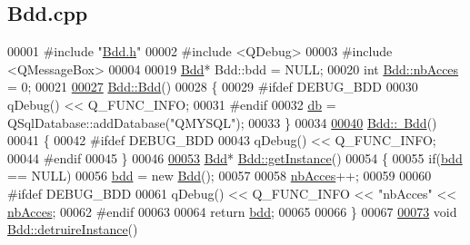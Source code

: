 \hypertarget{_bdd_8cpp_source}{}\subsection{Bdd.\+cpp}
\label{_bdd_8cpp_source}

\begin{DoxyCode}
00001 \textcolor{preprocessor}{#include "\hyperlink{_bdd_8h}{Bdd.h}"}
00002 \textcolor{preprocessor}{#include <QDebug>}
00003 \textcolor{preprocessor}{#include <QMessageBox>}
00004 
00019 \hyperlink{class_bdd}{Bdd}* Bdd::bdd = NULL;
00020 \textcolor{keywordtype}{int} \hyperlink{class_bdd_a9fb6aa118a28c27307f27fd7662e462d}{Bdd::nbAcces} = 0;
00021 
\hyperlink{class_bdd_a5306aeacb2baa3be8d4d3f8326527f60}{00027} \hyperlink{class_bdd_a5306aeacb2baa3be8d4d3f8326527f60}{Bdd::Bdd}()
00028 \{
00029 \textcolor{preprocessor}{    #ifdef DEBUG\_BDD}
00030     qDebug() << Q\_FUNC\_INFO;
00031 \textcolor{preprocessor}{    #endif}
00032     \hyperlink{class_bdd_a8628c1686deda86999f86689c3e7268e}{db} = QSqlDatabase::addDatabase(\textcolor{stringliteral}{"QMYSQL"});
00033 \}
00034 
\hyperlink{class_bdd_a5029277f27f8cfcf9d8603fb331a15dd}{00040} \hyperlink{class_bdd_a5029277f27f8cfcf9d8603fb331a15dd}{Bdd::~Bdd}()
00041 \{
00042 \textcolor{preprocessor}{    #ifdef DEBUG\_BDD}
00043     qDebug() << Q\_FUNC\_INFO;
00044 \textcolor{preprocessor}{    #endif}
00045 \}
00046 
\hyperlink{class_bdd_a6f55c29d593da12ca31fad02f5adfe24}{00053} \hyperlink{class_bdd}{Bdd}* \hyperlink{class_bdd_a6f55c29d593da12ca31fad02f5adfe24}{Bdd::getInstance}()
00054 \{
00055     \textcolor{keywordflow}{if}(\hyperlink{class_bdd_a09bd3b3a31feedf3dd42a507e0249213}{bdd} == NULL)
00056         \hyperlink{class_bdd_a09bd3b3a31feedf3dd42a507e0249213}{bdd} = \textcolor{keyword}{new} \hyperlink{class_bdd_a5306aeacb2baa3be8d4d3f8326527f60}{Bdd}();
00057 
00058     \hyperlink{class_bdd_a9fb6aa118a28c27307f27fd7662e462d}{nbAcces}++;
00059 
00060 \textcolor{preprocessor}{    #ifdef DEBUG\_BDD}
00061     qDebug() << Q\_FUNC\_INFO << \textcolor{stringliteral}{"nbAcces"} << \hyperlink{class_bdd_a9fb6aa118a28c27307f27fd7662e462d}{nbAcces};
00062 \textcolor{preprocessor}{    #endif}
00063 
00064     \textcolor{keywordflow}{return} \hyperlink{class_bdd_a09bd3b3a31feedf3dd42a507e0249213}{bdd};
00065 
00066 \}
00067 
\hyperlink{class_bdd_af89fa3ffa107c7859a3964bf032cfdb7}{00073} \textcolor{keywordtype}{void} \hyperlink{class_bdd_af89fa3ffa107c7859a3964bf032cfdb7}{Bdd::detruireInstance}()

\end{DoxyCode}
